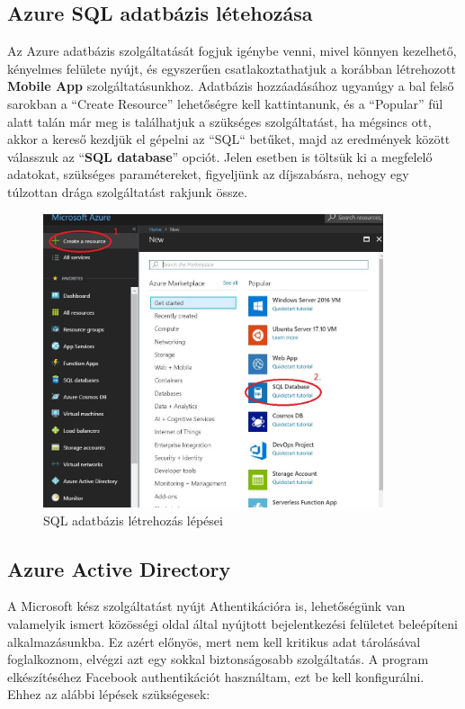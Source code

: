 \documentclass[a4paper,12pt]{report}
\begin{document}
\subsection{Azure SQL adatbázis létehozása}
    Az Azure adatbázis szolgáltatását fogjuk igénybe venni, mivel könnyen kezelhető, kényelmes felülete nyújt, és egyszerűen
    csatlakoztathatjuk a korábban létrehozott \textbf{Mobile App} szolgáltatásunkhoz.
    Adatbázis hozzáadásához ugyanúgy a bal felső sarokban a ``Create Resource'' lehetőségre kell kattintanunk, és a ``Popular''
    fül alatt talán már meg is találhatjuk a szükséges szolgáltatást, ha mégsincs ott, akkor a kereső kezdjük el gépelni az ``SQL``
    betűket, majd az eredmények között válasszuk az ``\textbf{SQL database}'' opciót.
    Jelen esetben is töltsük ki a megfelelő adatokat, szükséges paramétereket, figyeljünk az díjszabásra, nehogy egy túlzottan drága
    szolgáltatást rakjunk össze.

\begin{figure}[H]
    \centering
    \includegraphics[width=10cm,keepaspectratio]{images/azuresqldatabase.jpg}
    \caption{SQL adatbázis létrehozás lépései}
    \label{fig: SQLDatabase}
\end{figure}

\subsection{Azure Active Directory}
    A Microsoft kész szolgáltatást nyújt Athentikációra is, lehetőségünk van valamelyik ismert közösségi oldal által nyújtott
    bejelentkezési felületet beleépíteni alkalmazásunkba. Ez azért előnyös, mert nem kell kritikus adat tárolásával foglalkoznom,
    elvégzi azt egy sokkal biztonságosabb szolgáltatás. A program elkészítéséhez Facebook authentikációt használtam, ezt be kell
    konfigurálni.
    Ehhez az alábbi lépések szükségesek:
\end{document}
